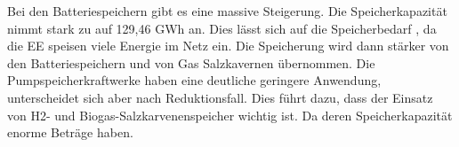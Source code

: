 Bei den Batteriespeichern gibt es eine massive Steigerung. Die Speicherkapazität nimmt stark zu auf  129,46 GWh an. Dies lässt sich auf die Speicherbedarf , da die EE speisen viele Energie im Netz ein. Die Speicherung  wird dann stärker von den Batteriespeichern und von Gas Salzkavernen übernommen. Die Pumpspeicherkraftwerke haben eine deutliche geringere  Anwendung, unterscheidet sich aber nach Reduktionsfall. Dies führt dazu, dass der Einsatz von  H2- und Biogas-Salzkarvenenspeicher wichtig ist. Da deren Speicherkapazität enorme Beträge haben.
